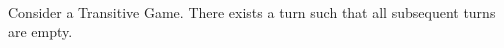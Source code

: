 \begin{theorem} \ \\
   \label{convergence}
   Consider a Transitive Game. There exists a turn such that all subsequent turns are empty.
\end{theorem}
